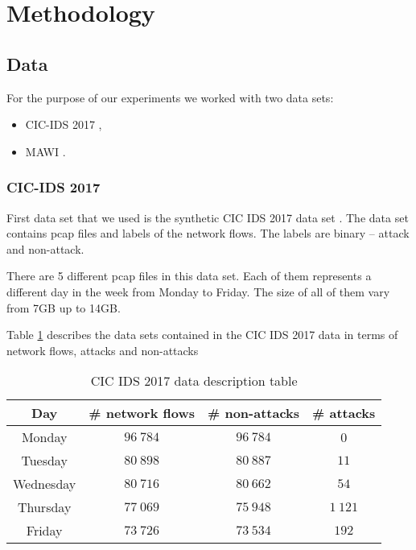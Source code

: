 \documentclass{article}
\begin{document}
\section{Methodology}
\subsection{Data}\label{sec-data-cic-ids-2017}
For the purpose of our experiments we worked with two data sets:

\begin{itemize}
    \item CIC-IDS 2017 \cite{sharafaldin2018toward},
    \item MAWI \cite{mawilab}.
\end{itemize}

\subsubsection{CIC-IDS 2017}
First data set that we used is the synthetic CIC IDS 2017 data set \cite{sharafaldin2018toward}. The data set contains pcap files and labels of the network flows. The labels are binary -- attack and non-attack.

There are 5 different pcap files in this data set. Each of them represents a different day in the week from Monday to Friday. The size of all of them vary from 7GB up to 14GB.

Table \ref{tab:cic-ids2017-data-description} describes the data sets contained in the CIC IDS 2017 data in terms of network flows, attacks and non-attacks

\begin{table}[h!]
\centering
    \begin{tabular}{ |c|c|c|c| }
        \hline
        Day & \# network flows & \# non-attacks & \# attacks \\
        \hline
        Monday & $96\ 784$ & $96\ 784$ & 0 \\
        Tuesday & $80\ 898$ & $80\ 887$ & $11$ \\
        Wednesday & $80\ 716$ & $80\ 662$ & $54$ \\
        Thursday & $77\ 069$ & $75\ 948$ & $1\ 121$ \\
        Friday & $73\ 726$ & $73\ 534$ & $192$ \\
        \hline
    \end{tabular}
\caption{CIC IDS 2017 data description table}
\label{tab:cic-ids2017-data-description}
\end{table}
\end{document}
